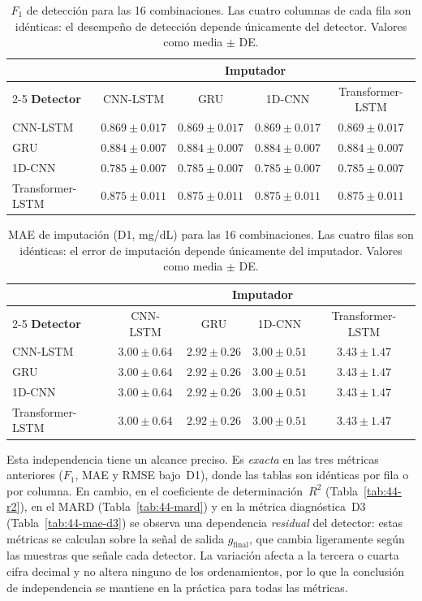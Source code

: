 \documentclass{report}
\begin{document}
\begin{table}[htbp]
\centering
\caption{$F_1$ de detección para las 16 combinaciones. Las cuatro columnas de cada fila son idénticas: el desempeño de detección depende únicamente del detector. Valores como media $\pm$ DE.}
\label{tab:44-f1}
\small
\begin{tabular}{lcccc}
\toprule
 & \multicolumn{4}{c}{\textbf{Imputador}} \\
\cmidrule(lr){2-5}
\textbf{Detector} & CNN-LSTM & GRU & 1D-CNN & Transformer-LSTM \\
\midrule
CNN-LSTM          & $0.869 \pm 0.017$ & $0.869 \pm 0.017$ & $0.869 \pm 0.017$ & $0.869 \pm 0.017$ \\
GRU               & $0.884 \pm 0.007$ & $0.884 \pm 0.007$ & $0.884 \pm 0.007$ & $0.884 \pm 0.007$ \\
1D-CNN            & $0.785 \pm 0.007$ & $0.785 \pm 0.007$ & $0.785 \pm 0.007$ & $0.785 \pm 0.007$ \\
Transformer-LSTM  & $0.875 \pm 0.011$ & $0.875 \pm 0.011$ & $0.875 \pm 0.011$ & $0.875 \pm 0.011$ \\
\bottomrule
\end{tabular}
\end{table}

\begin{table}[htbp]
\centering
\caption{MAE de imputación (D1, mg/dL) para las 16 combinaciones. Las cuatro filas son idénticas: el error de imputación depende únicamente del imputador. Valores como media $\pm$ DE.}
\label{tab:44-mae-d1}
\small
\begin{tabular}{lcccc}
\toprule
 & \multicolumn{4}{c}{\textbf{Imputador}} \\
\cmidrule(lr){2-5}
\textbf{Detector} & CNN-LSTM & GRU & 1D-CNN & Transformer-LSTM \\
\midrule
CNN-LSTM          & $3.00 \pm 0.64$ & $2.92 \pm 0.26$ & $3.00 \pm 0.51$ & $3.43 \pm 1.47$ \\
GRU               & $3.00 \pm 0.64$ & $2.92 \pm 0.26$ & $3.00 \pm 0.51$ & $3.43 \pm 1.47$ \\
1D-CNN            & $3.00 \pm 0.64$ & $2.92 \pm 0.26$ & $3.00 \pm 0.51$ & $3.43 \pm 1.47$ \\
Transformer-LSTM  & $3.00 \pm 0.64$ & $2.92 \pm 0.26$ & $3.00 \pm 0.51$ & $3.43 \pm 1.47$ \\
\bottomrule
\end{tabular}
\end{table}

Esta independencia tiene un alcance preciso. Es \emph{exacta} en las tres métricas anteriores ($F_1$, MAE y RMSE bajo~D1), donde las tablas son idénticas por fila o por columna. En cambio, en el coeficiente de determinación~$R^2$ (Tabla~\ref{tab:44-r2}), en el MARD (Tabla~\ref{tab:44-mard}) y en la métrica diagnóstica~D3 (Tabla~\ref{tab:44-mae-d3}) se observa una dependencia \emph{residual} del detector: estas métricas se calculan sobre la señal de salida $g_{\text{final}}$, que cambia ligeramente según las muestras que señale cada detector. La variación afecta a la tercera o cuarta cifra decimal y no altera ninguno de los ordenamientos, por lo que la conclusión de independencia se mantiene en la práctica para todas las métricas.
\end{document}
